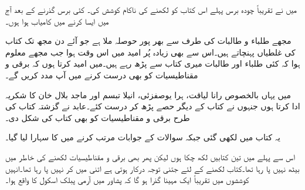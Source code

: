 میں نے تقریباً چودہ برس پہلے اس کتاب کو لکھنے کی ناکام کوشش کی۔ کئی برس گذرنے کے بعد آج میں ایسا کرنے میں کامیاب ہوا ہوں۔

مجھے طلباء و طالبات کی طرف سے بھر پور حوصلہ ملا ہے جو آئے دن مجھ تک کتاب کی غلطیاں پہنچاتے ہیں۔اس سے بھی زیادہ پُر امید میں اس وقت ہوا جب مجھے معلوم ہوا کہ کئی طلباء اور طالبات میری کتاب سے پڑھ رہے ہیں۔میں امید کرتا ہوں کہ برقی و مقناطیسیات کو بھی درست کرنے میں آپ مدد کریں گے۔

میں یہاں بالخصوص رانا لیاقت، ہرا یوصفزئی، انیلا تبسم اور ماجد بلال خان کا شکریہ ادا کرتا ہوں جنہوں نے کتاب کے دیگر حصے پڑھ کر درست کئے۔عابد نے گزشتہ کتاب کی طرح برقی و مقناطیسیات کو بھی کتاب کی شکل دی۔

یہ کتاب  میں لکھی گئی جبکہ سوالات کے جوابات مرتب کرنے میں  کا سہارا لیا گیا۔

اس سے پہلے میں تین کتابیں لکھ چکا ہوں لیکن پھر بھی برقی و مقناطیسیات لکھنے کی خاطر میں بیٹھ نہیں پا رہا تھا۔کتاب لکھنے کے لئے جتنی توجہ درکار ہوتی ہے اتنی میں کر نہیں پا رہا تھا۔انہیں کوششوں میں تقریباً ایک مہینا گذرا ہو گا کہ پشاور میں آرمی پبلک اسکول کا واقع ہوا۔ 

